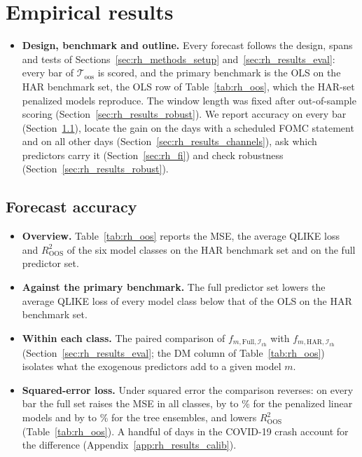 
\ifdefined\rhabNClassesBeatAddRm\else\fi
\ifdefined\rhcaNdaysSpan\else\fi
\ifdefined\rhmcsNModels\else\fi
\ifdefined\rhchNEventDays\else\fi

\section{Empirical results}
\label{sec:rh_results}
\label{sec:rh_exp_setup}
\begin{itemize}
\item \textbf{Design, benchmark and outline.} Every forecast follows the design, spans and tests of
  Sections~\ref{sec:rh_methods_setup} and~\ref{sec:rh_results_eval}: every bar of $\mathcal T_{\mathrm{oos}}$ is
  scored, and the primary benchmark is the OLS on the HAR benchmark set, the OLS row of Table~\ref{tab:rh_oos}, which
  the HAR-set penalized models reproduce. The window length was fixed after out-of-sample scoring
  (Section~\ref{sec:rh_results_robust}). We report accuracy on every bar (Section~\ref{sec:rh_results_oos}), locate
  the gain on the days with a scheduled FOMC statement and on all other days (Section~\ref{sec:rh_results_channels}),
  ask which predictors carry it (Section~\ref{sec:rh_fi}) and check robustness (Section~\ref{sec:rh_results_robust}).
\end{itemize}

\subsection{Forecast accuracy}
\label{sec:rh_results_oos}
\label{sec:rh_results_predictors}
\begin{itemize}
\item \textbf{Overview.} Table~\ref{tab:rh_oos} reports the MSE, the average QLIKE loss and $R^2_{\mathrm{OOS}}$ of
  the six model classes on the HAR benchmark set and on the full predictor set.
\item \textbf{Against the primary benchmark.} The full predictor set lowers the average QLIKE loss of every model
  class below that of the OLS on the HAR benchmark set.
\item \textbf{Within each class.} The paired comparison of $f_{m,\mathrm{Full},\mathcal I_{\mathrm{rh}}}$ with
  $f_{m,\mathrm{HAR},\mathcal I_{\mathrm{rh}}}$ (Section~\ref{sec:rh_results_eval}; the DM column of
  Table~\ref{tab:rh_oos}) isolates what the exogenous predictors add to a given model $m$.
\item \textbf{Squared-error loss.} Under squared error the comparison reverses: on every bar the full set raises the
  MSE in all \rhorAfPairs{} classes, by \rhcaLinMsePctBarSpanMin{} to \rhcaLinMsePctBarSpanMax\% for the penalized
  linear models and by \rhcaTreeMsePctBarSpanMin{} to \rhcaTreeMsePctBarSpanMax\% for the tree ensembles, and lowers
  $R^2_{\mathrm{OOS}}$ (Table~\ref{tab:rh_oos}). A handful of days in the COVID-19 crash account for the difference
  (Appendix~\ref{app:rh_results_calib}).
\end{itemize}

